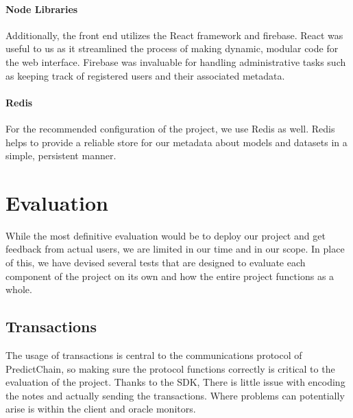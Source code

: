 \documentclass{article}
\begin{document}
    \paragraph{Node Libraries}
    Additionally, the front end utilizes the React framework and firebase.  React was useful to us as it streamlined the process of making
    dynamic, modular code for the web interface.  Firebase was invaluable for handling administrative tasks such as keeping
    track of registered users and their associated metadata.
    
    \paragraph{Redis}
    For the recommended configuration of the project, we use Redis as well.  Redis helps to provide a reliable store for
    our metadata about models and datasets in a simple, persistent manner.

    \section{Evaluation}


    While the most definitive evaluation would be to deploy our project and get feedback from actual users, we are limited
    in our time and in our scope.  In place of this, we have devised several tests that are designed to evaluate each
    component of the project on its own and how the entire project functions as a whole.

    \subsection{Transactions}

    The usage of transactions is central to the communications protocol of PredictChain, so making sure the protocol
    functions correctly is critical to the evaluation of the project.  Thanks to the SDK, There is little issue with encoding the
    notes and actually sending the transactions.  Where problems can potentially arise is within the
    client and oracle monitors.
\end{document}
